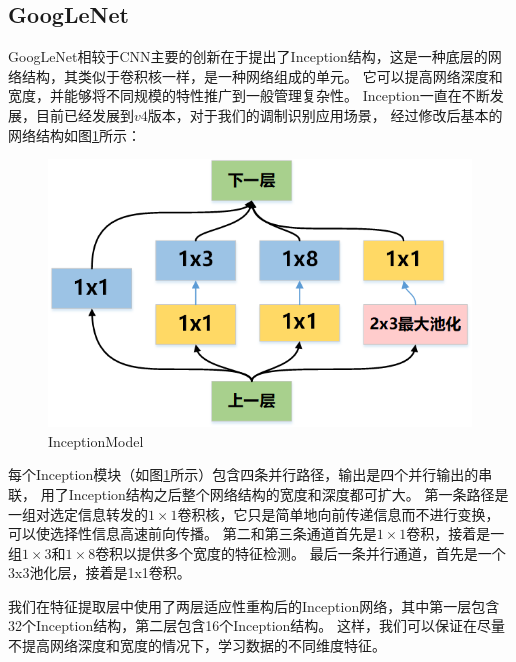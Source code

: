 \subsection{GoogLeNet}
GoogLeNet相较于CNN主要的创新在于提出了Inception结构，这是一种底层的网络结构，其类似于卷积核一样，是一种网络组成的单元。
它可以提高网络深度和宽度，并能够将不同规模的特性推广到一般管理复杂性。
Inception一直在不断发展，目前已经发展到$v4$版本，对于我们的调制识别应用场景，
经过修改后基本的网络结构如图\ref{sec:fig_5_5}所示：\par
\begin{figure}[!h]
	\centering
	\includegraphics[scale=0.8]{figures/chapter_5/fig_5_5}
	\caption{InceptionModel}\label{sec:fig_5_5}
\end{figure}
每个Inception模块（如图\ref{sec:fig_5_5}所示）包含四条并行路径，输出是四个并行输出的串联，
用了Inception结构之后整个网络结构的宽度和深度都可扩大。
第一条路径是一组对选定信息转发的$1\times1$卷积核，它只是简单地向前传递信息而不进行变换，
可以使选择性信息高速前向传播。
第二和第三条通道首先是$1\times1$卷积，接着是一组$1\times3$和$1\times8$卷积以提供多个宽度的特征检测。
最后一条并行通道，首先是一个3x3池化层，接着是1x1卷积。\par
我们在特征提取层中使用了两层适应性重构后的Inception网络，其中第一层包含32个Inception结构，第二层包含16个Inception结构。
这样，我们可以保证在尽量不提高网络深度和宽度的情况下，学习数据的不同维度特征。\par

